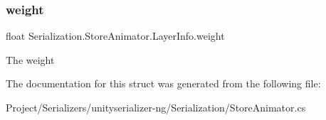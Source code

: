 \subsubsection{\texorpdfstring{weight}{weight}}
{\footnotesize\ttfamily float Serialization.\+Store\+Animator.\+Layer\+Info.\+weight}



The weight 



The documentation for this struct was generated from the following file\+:\begin{DoxyCompactItemize}
\item 
Project/\+Serializers/unityserializer-\/ng/\+Serialization/Store\+Animator.\+cs\end{DoxyCompactItemize}
